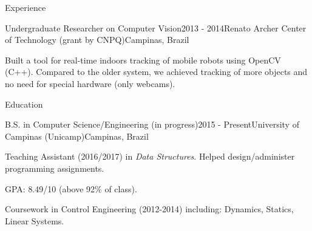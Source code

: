 \documentclass[8pt]{resume}
\newcommand{\tit}[1]{\textit{#1}}
\begin{document}
\begin{rSection}{Experience}
\begin{rSubsection}{Undergraduate Researcher on Computer Vision}{2013 - 2014}{Renato Archer Center of Technology (grant by CNPQ)}{Campinas, Brazil}
    \item Built a tool for real-time indoors tracking of
        mobile robots using OpenCV (C++). Compared to the older system,
        we achieved tracking of more objects
        and no need for special hardware (only webcams).
\end{rSubsection}

\end{rSection}

\begin{rSection}{Education}

    \begin{rSubsection}{B.S. in Computer Science/Engineering (in progress)}{2015 - Present}{University of Campinas (Unicamp)}{Campinas, Brazil}
    \item Teaching Assistant (2016/2017) in \tit{Data Structures}. Helped
        design/administer programming assignments.
    \item GPA: 8.49/10 (above 92\% of class).
    \item Coursework in Control Engineering (2012-2014) including:
        Dynamics, Statics, Linear Systems.
\end{rSubsection}

\end{rSection}
\end{document}
